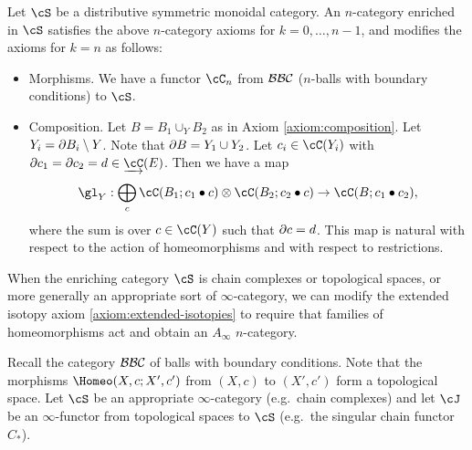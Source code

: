 \begin{axiom}
\label{axiom:enriched}
Let $\cS$ be a distributive symmetric monoidal category.
An $n$-category enriched in $\cS$ satisfies the above $n$-category axioms for $k=0,\ldots,n-1$,
and modifies the axioms for $k=n$ as follows:
\begin{itemize}
\item Morphisms. We have a functor $\cC_n$ from ${\mathcal{BBC}}$ ($n$-balls with boundary conditions) to $\cS$.
\item Composition. Let $B = B_1\cup_Y B_2$ as in Axiom \ref{axiom:composition}.
Let $Y_i = \partial B_i \setminus Y$.  
Note that $\partial B = Y_1\cup Y_2$.
Let $c_i \in \cC(Y_i)$ with $\bd c_1 = \bd c_2 = d \in \cl\cC(E)$.
Then we have a map
\[
	\gl_Y : \bigoplus_c \cC(B_1; c_1 \bullet c) \otimes \cC(B_2; c_2\bullet c) \to \cC(B; c_1\bullet c_2),
\]
where the sum is over $c\in\cC(Y)$ such that $\partial c = d$.
This map is natural with respect to the action of homeomorphisms and with respect to restrictions.
\end{itemize}
\end{axiom}

\medskip

When the enriching category $\cS$ is chain complexes or topological spaces,
or more generally an appropriate sort of $\infty$-category,
we can modify the extended isotopy axiom \ref{axiom:extended-isotopies}
to require that families of homeomorphisms act
and obtain an $A_\infty$ $n$-category.


Recall the category ${\mathcal{BBC}}$ of balls with boundary conditions.
Note that the morphisms $\Homeo(X,c; X', c')$ from $(X, c)$ to $(X', c')$ form a topological space.
Let $\cS$ be an appropriate $\infty$-category (e.g.\ chain complexes)
and let $\cJ$ be an $\infty$-functor from topological spaces to $\cS$
(e.g.\ the singular chain functor $C_*$).

